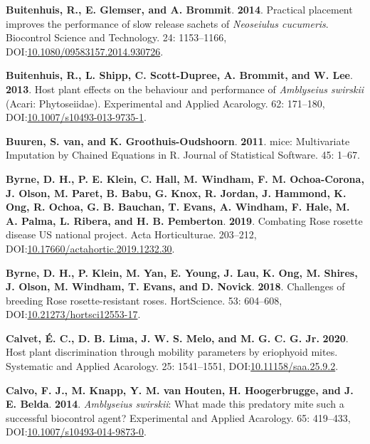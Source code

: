 \documentclass[12pt,final,CPage]{ufthesis}
\newlength{\cslhangindent}
\newenvironment{CSLReferences}[2] %
{%
	\setlength{\parindent}{0pt}
	\ifodd #1 \everypar{\setlength{\hangindent}{\cslhangindent}}\ignorespaces\fi
	\ifnum #2 > 0
	\setlength{\parskip}{#2\baselineskip}
	\fi
}%
{}
\begin{document}
{\begin{CSLReferences}{1}{0}
  \leavevmode{}%
  \textbf{Buitenhuis, R., E. Glemser, and A. Brommit}. \textbf{2014}. Practical placement improves the performance of slow release sachets of {\emph{Neoseiulus cucumeris}}. Biocontrol Science and Technology. 24: 1153--1166, DOI:\href{https://doi.org/10.1080/09583157.2014.930726}{10.1080/09583157.2014.930726}.

  \leavevmode{}%
  \textbf{Buitenhuis, R., L. Shipp, C. Scott-Dupree, A. Brommit, and W. Lee}. \textbf{2013}. Host plant effects on the behaviour and performance of {\emph{Amblyseius swirskii}} ({Acari}: {Phytoseiidae}). Experimental and Applied Acarology. 62: 171--180, DOI:\href{https://doi.org/10.1007/s10493-013-9735-1}{10.1007/s10493-013-9735-1}.

  \leavevmode{}%
  \textbf{Buuren, S. van, and K. Groothuis-Oudshoorn}. \textbf{2011}. {mice}: {Multivariate} {Imputation} by {Chained} {Equations} in {R}. Journal of Statistical Software. 45: 1--67.

  \leavevmode{}%
  \textbf{Byrne, D. H., P. E. Klein, C. Hall, M. Windham, F. M. Ochoa-Corona, J. Olson, M. Paret, B. Babu, G. Knox, R. Jordan, J. Hammond, K. Ong, R. Ochoa, G. B. Bauchan, T. Evans, A. Windham, F. Hale, M. A. Palma, L. Ribera, and H. B. Pemberton}. \textbf{2019}. Combating {Rose rosette disease} {US} national project. Acta Horticulturae. 203--212, DOI:\href{https://doi.org/10.17660/actahortic.2019.1232.30}{10.17660/actahortic.2019.1232.30}.

  \leavevmode{}%
  \textbf{Byrne, D. H., P. Klein, M. Yan, E. Young, J. Lau, K. Ong, M. Shires, J. Olson, M. Windham, T. Evans, and D. Novick}. \textbf{2018}. Challenges of breeding {Rose rosette}-resistant roses. {HortScience}. 53: 604--608, DOI:\href{https://doi.org/10.21273/hortsci12553-17}{10.21273/hortsci12553-17}.

  \leavevmode{}%
  \textbf{Calvet, É. C., D. B. Lima, J. W. S. Melo, and M. G. C. G. Jr.} \textbf{2020}. Host plant discrimination through mobility parameters by eriophyoid mites. Systematic and Applied Acarology. 25: 1541--1551, DOI:\href{https://doi.org/10.11158/saa.25.9.2}{10.11158/saa.25.9.2}.

  \leavevmode{}%
  \textbf{Calvo, F. J., M. Knapp, Y. M. van Houten, H. Hoogerbrugge, and J. E. Belda}. \textbf{2014}. {\emph{Amblyseius swirskii}}: What made this predatory mite such a successful biocontrol agent? Experimental and Applied Acarology. 65: 419--433, DOI:\href{https://doi.org/10.1007/s10493-014-9873-0}{10.1007/s10493-014-9873-0}.


\end{CSLReferences}}
\end{document}

